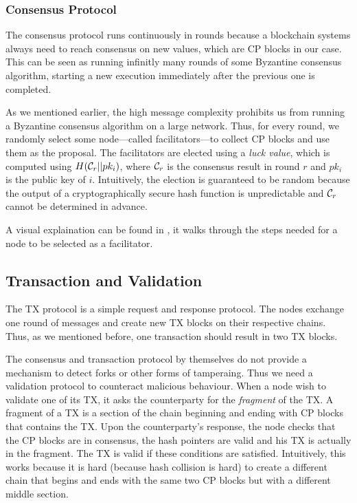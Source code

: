 
\subsubsection*{Consensus Protocol} 
The consensus protocol runs continuously in rounds
because a blockchain systems always need to reach consensus on new values, which are CP blocks in our case.
This can be seen as running infinitly many rounds of some Byzantine consensus algorithm,
starting a new execution immediately after the previous one is completed.

As we mentioned earlier, the high message complexity prohibits us from running a Byzantine consensus algorithm on a large network.
Thus, for every round, we randomly select some node---called facilitators---to collect CP blocks and use them as the proposal.
The facilitators are elected using a \emph{luck value}, which is computed using $H(\mathcal{C}_r || pk_i)$,
where $\mathcal{C}_r$ is the consensus result in round $r$ and $pk_i$ is the public key of $i$.
Intuitively, the election is guaranteed to be random 
because the output of a cryptographically secure hash function is unpredictable and $\mathcal{C}_r$ cannot be determined in advance.

A visual explaination can be found in ,
it walks through the steps needed for a node to be selected as a facilitator.

\subsection{Transaction and Validation}
The TX protocol is a simple request and response protocol.
The nodes exchange one round of messages and create new TX blocks on their respective chains.
Thus, as we mentioned before, one transaction should result in two TX blocks.

The consensus and transaction protocol by themselves do not provide a mechanism to detect forks or other forms of tamperaing.
Thus we need a validation protocol to counteract malicious behaviour.
When a node wish to validate one of its TX, it asks the counterparty for the \emph{fragment} of the TX.
A fragment of a TX is a section of the chain beginning and ending with CP blocks that contains the TX.
Upon the counterparty's response, the node checks that the CP blocks are in consensus, the hash pointers are valid and his TX is actually in the fragment.
The TX is valid if these conditions are satisfied.
Intuitively, this works because it is hard (because hash collision is hard)
 to create a different chain that begins and ends with the same two CP blocks but with a different middle section.


